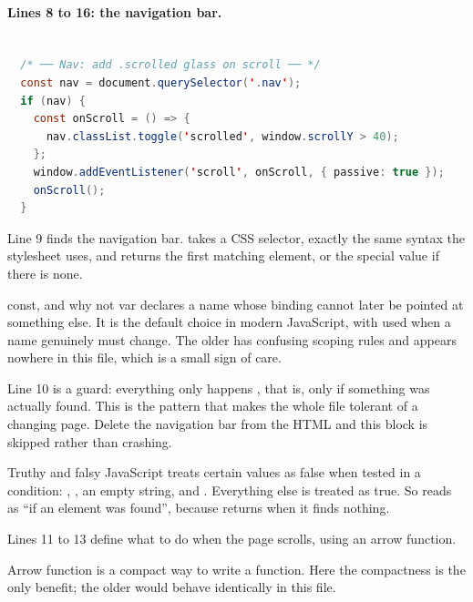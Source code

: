 \paragraph{Lines 8 to 16: the navigation bar.}

\begin{lstlisting}[language=Java,firstnumber=7,caption={\file{js/main.js}, lines 7--16}]

  /* ── Nav: add .scrolled glass on scroll ── */
  const nav = document.querySelector('.nav');
  if (nav) {
    const onScroll = () => {
      nav.classList.toggle('scrolled', window.scrollY > 40);
    };
    window.addEventListener('scroll', onScroll, { passive: true });
    onScroll();
  }
\end{lstlisting}

Line 9 finds the navigation bar.  takes a CSS
selector, exactly the same syntax the stylesheet uses, and returns the first
matching element, or the special value  if there is none.

\begin{jargon}{const, and why not var}
 declares a name whose binding cannot later be pointed at something
else. It is the default choice in modern JavaScript, with  used when a
name genuinely must change. The older  has confusing scoping rules and
appears nowhere in this file, which is a small sign of care.
\end{jargon}

Line 10 is a guard: everything only happens , that is, only if
something was actually found. This is the pattern that makes the whole file
tolerant of a changing page. Delete the navigation bar from the HTML and this
block is skipped rather than crashing.

\begin{jargon}{Truthy and falsy}
JavaScript treats certain values as false when tested in a condition:
, , an empty string,  and .
Everything else is treated as true. So  reads as ``if an element
was found'', because  returns  when it finds
nothing.
\end{jargon}

Lines 11 to 13 define what to do when the page scrolls, using an arrow function.

\begin{jargon}{Arrow function}
 is a compact way to write a function. Here the compactness
is the only benefit; the older  would behave
identically in this file.
\end{jargon}

